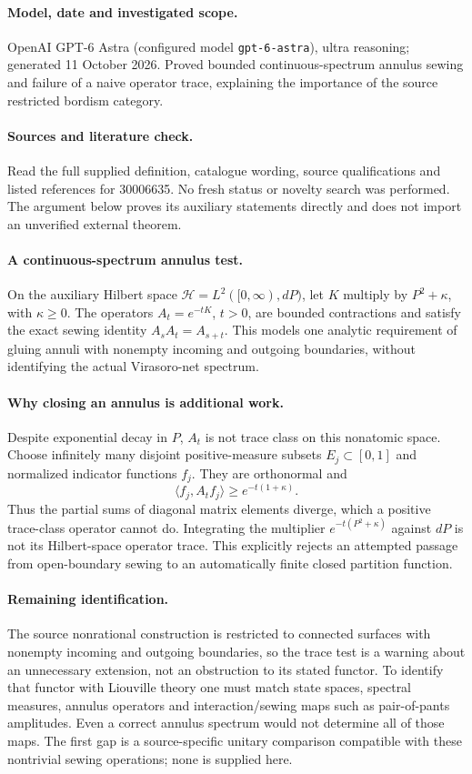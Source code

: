 \documentclass[11pt]{article}
\begin{document}
\paragraph{Model, date and investigated scope.}
OpenAI GPT-6 Astra (configured model \texttt{gpt-6-astra}), ultra reasoning; generated 11 October 2026. Proved bounded continuous-spectrum annulus sewing and failure of a naive operator trace, explaining the importance of the source restricted bordism category.

\paragraph{Sources and literature check.}
Read the full supplied definition, catalogue wording, source qualifications and listed references for 30006635. No fresh status or novelty search was performed. The argument below proves its auxiliary statements directly and does not import an unverified external theorem.

\paragraph{A continuous-spectrum annulus test.} On the auxiliary Hilbert space \(\mathcal H=L^2([0,\infty),dP)\), let \(K\) multiply by \(P^2+\kappa\), with \(\kappa\geq0\). The operators \(A_t=e^{-tK}\), \(t>0\), are bounded contractions and satisfy the exact sewing identity \(A_sA_t=A_{s+t}\). This models one analytic requirement of gluing annuli with nonempty incoming and outgoing boundaries, without identifying the actual Virasoro-net spectrum.
\paragraph{Why closing an annulus is additional work.} Despite exponential decay in \(P\), \(A_t\) is not trace class on this nonatomic space. Choose infinitely many disjoint positive-measure subsets \(E_j\subset[0,1]\) and normalized indicator functions \(f_j\). They are orthonormal and
\[
 \langle f_j,A_tf_j\rangle\geq e^{-t(1+\kappa)}.
\]
Thus the partial sums of diagonal matrix elements diverge, which a positive trace-class operator cannot do. Integrating the multiplier \(e^{-t(P^2+\kappa)}\) against \(dP\) is not its Hilbert-space operator trace. This explicitly rejects an attempted passage from open-boundary sewing to an automatically finite closed partition function.
\paragraph{Remaining identification.} The source nonrational construction is restricted to connected surfaces with nonempty incoming and outgoing boundaries, so the trace test is a warning about an unnecessary extension, not an obstruction to its stated functor. To identify that functor with Liouville theory one must match state spaces, spectral measures, annulus operators and interaction/sewing maps such as pair-of-pants amplitudes. Even a correct annulus spectrum would not determine all of those maps. The first gap is a source-specific unitary comparison compatible with these nontrivial sewing operations; none is supplied here.
\end{document}
